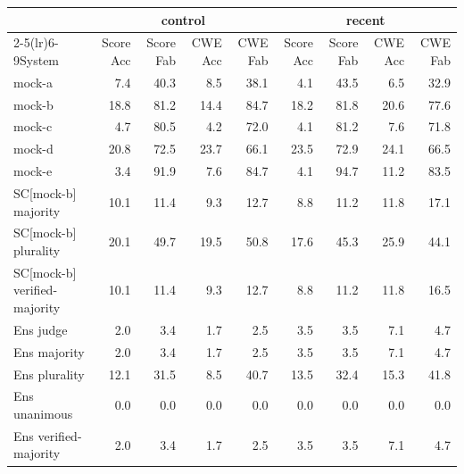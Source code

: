 \begin{tabular}{lrrrrrrrr}
\toprule
 & \multicolumn{4}{c}{control} & \multicolumn{4}{c}{recent} \\\cmidrule(lr){2-5}\cmidrule(lr){6-9}System & Score Acc & Score Fab & CWE Acc & CWE Fab & Score Acc & Score Fab & CWE Acc & CWE Fab \\
\midrule
mock-a & 7.4 & 40.3 & 8.5 & 38.1 & 4.1 & 43.5 & 6.5 & 32.9 \\
mock-b & 18.8 & 81.2 & 14.4 & 84.7 & 18.2 & 81.8 & 20.6 & 77.6 \\
mock-c & 4.7 & 80.5 & 4.2 & 72.0 & 4.1 & 81.2 & 7.6 & 71.8 \\
mock-d & 20.8 & 72.5 & 23.7 & 66.1 & 23.5 & 72.9 & 24.1 & 66.5 \\
mock-e & 3.4 & 91.9 & 7.6 & 84.7 & 4.1 & 94.7 & 11.2 & 83.5 \\
\midrule
SC[mock-b] majority & 10.1 & 11.4 & 9.3 & 12.7 & 8.8 & 11.2 & 11.8 & 17.1 \\
SC[mock-b] plurality & 20.1 & 49.7 & 19.5 & 50.8 & 17.6 & 45.3 & 25.9 & 44.1 \\
SC[mock-b] verified-majority & 10.1 & 11.4 & 9.3 & 12.7 & 8.8 & 11.2 & 11.8 & 16.5 \\
\midrule
Ens judge & 2.0 & 3.4 & 1.7 & 2.5 & 3.5 & 3.5 & 7.1 & 4.7 \\
Ens majority & 2.0 & 3.4 & 1.7 & 2.5 & 3.5 & 3.5 & 7.1 & 4.7 \\
Ens plurality & 12.1 & 31.5 & 8.5 & 40.7 & 13.5 & 32.4 & 15.3 & 41.8 \\
Ens unanimous & 0.0 & 0.0 & 0.0 & 0.0 & 0.0 & 0.0 & 0.0 & 0.0 \\
Ens verified-majority & 2.0 & 3.4 & 1.7 & 2.5 & 3.5 & 3.5 & 7.1 & 4.7 \\
\bottomrule
\end{tabular}
